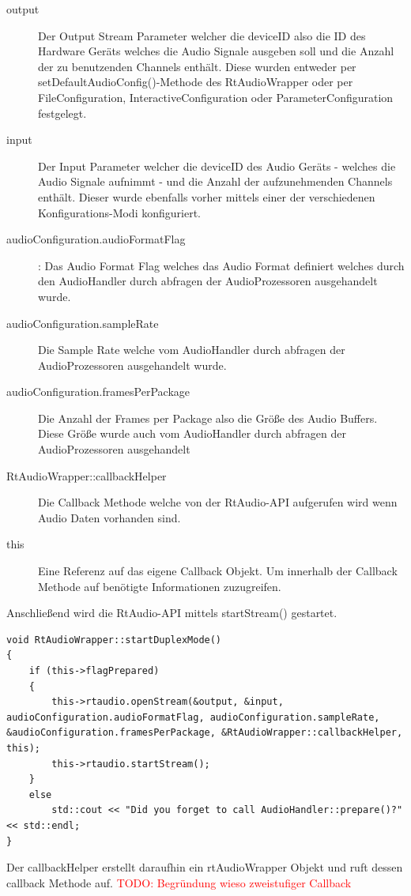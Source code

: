 \begin{description}
\item[output] Der Output Stream Parameter welcher die deviceID also die ID des Hardware Geräts welches die Audio Signale ausgeben soll und die Anzahl der zu benutzenden Channels enthält. Diese wurden entweder per setDefaultAudioConfig()-Methode des RtAudioWrapper oder per FileConfiguration, InteractiveConfiguration oder ParameterConfiguration festgelegt.
\item [input] Der Input Parameter welcher die deviceID des Audio Geräts - welches die Audio Signale aufnimmt - und die Anzahl der aufzunehmenden Channels enthält. Dieser wurde ebenfalls vorher mittels einer der verschiedenen Konfigurations-Modi konfiguriert.
\item [audioConfiguration.audioFormatFlag] : Das Audio Format Flag welches das Audio Format definiert welches durch den AudioHandler durch abfragen der AudioProzessoren ausgehandelt wurde.
\item [audioConfiguration.sampleRate] Die Sample Rate welche vom AudioHandler durch abfragen der AudioProzessoren ausgehandelt wurde.
\item [audioConfiguration.framesPerPackage] Die Anzahl der Frames per Package also die Größe des Audio Buffers. Diese Größe wurde auch vom AudioHandler durch abfragen der AudioProzessoren ausgehandelt
\item [RtAudioWrapper::callbackHelper] Die Callback Methode welche von der RtAudio-API aufgerufen wird wenn Audio Daten vorhanden sind.
\item [this] Eine Referenz auf das eigene Callback Objekt. Um innerhalb der Callback Methode auf benötigte Informationen zuzugreifen.
\end{description}

Anschließend wird die RtAudio-API mittels startStream() gestartet.

\begin{lstlisting}[caption={Start des Duplex Mode im RtAudioWrapper},label={Code:RtAudio}]
void RtAudioWrapper::startDuplexMode()
{
    if (this->flagPrepared)
    {
        this->rtaudio.openStream(&output, &input, audioConfiguration.audioFormatFlag, audioConfiguration.sampleRate, &audioConfiguration.framesPerPackage, &RtAudioWrapper::callbackHelper, this);
        this->rtaudio.startStream();
    }
    else
        std::cout << "Did you forget to call AudioHandler::prepare()?" << std::endl;
}
\end{lstlisting}

Der callbackHelper erstellt daraufhin ein rtAudioWrapper Objekt und ruft dessen callback Methode auf. \textcolor{red}{TODO: Begründung wieso zweistufiger Callback}

